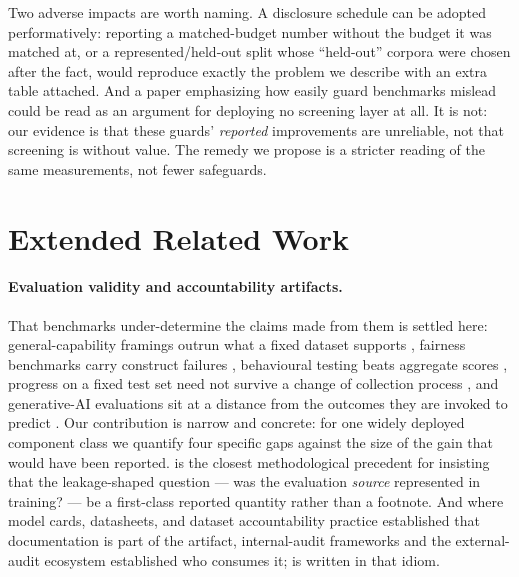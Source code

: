 \documentclass[manuscript,screen,review,anonymous]{acmart}
\begin{document}
Two adverse impacts are worth naming. A disclosure schedule can be adopted performatively: reporting a
matched-budget number without the budget it was matched at, or a represented/held-out split whose
``held-out'' corpora were chosen after the fact, would reproduce exactly the problem we describe with
an extra table attached. And a paper emphasizing how easily guard benchmarks mislead could be read as
an argument for deploying no screening layer at all. It is not: our evidence is that these guards'
\emph{reported} improvements are unreliable, not that screening is without value. The remedy we propose
is a stricter reading of the same measurements, not fewer safeguards.




\appendix
\section{Extended Related Work}
\label{app:related}

\paragraph{Evaluation validity and accountability artifacts.} That benchmarks under-determine the claims
made from them is settled here: general-capability framings outrun what a fixed dataset supports
\citep{raji2021everything}, fairness benchmarks carry construct failures
\citep{blodgett2021salmon}, behavioural testing beats aggregate scores
\citep{bowman2021benchmarking,ribeiro2020checklist}, progress on a fixed test set need not survive a
change of collection process \citep{recht2019imagenet,taori2020measuring}, and generative-AI evaluations
sit at a distance from the outcomes they are invoked to predict
\citep{weidinger2023sociotechnical,solaiman2023socialimpact,liao2023sociotechnicalgap}. Our contribution
is narrow and concrete: for one widely deployed component class we quantify four specific gaps against
the size of the gain that would have been reported. \citet{kapoor2023leakage} is the closest
methodological precedent for insisting that the leakage-shaped question --- was the evaluation
\emph{source} represented in training? --- be a first-class reported quantity rather than a footnote. And
where model cards, datasheets, and dataset accountability practice
\citep{mitchell2019modelcards,gebru2021datasheets,hutchinson2021accountability} established that
documentation is part of the artifact, internal-audit frameworks \citep{raji2020closing} and the
external-audit ecosystem \citep{metaxa2021auditing,raji2022outsider} established who consumes it;
 is written in that idiom.
\end{document}
